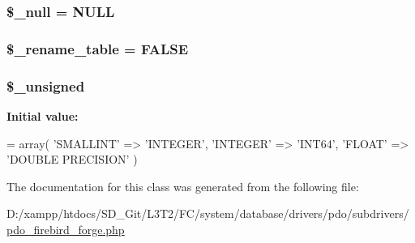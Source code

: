 \subsubsection[{\$\+\_\+null}]{\setlength{\rightskip}{0pt plus 5cm}\$\+\_\+null = \textquotesingle{}N\+U\+L\+L\textquotesingle{}\hspace{0.3cm}{\ttfamily [protected]}}\label{class_c_i___d_b__pdo__firebird__forge_ae58fe6a5104d4a069a49b27533ce808f}
\hypertarget{class_c_i___d_b__pdo__firebird__forge_a1a649e7cf9de16bcf932977b18bc91de}{}
\subsubsection[{\$\+\_\+rename\+\_\+table}]{\setlength{\rightskip}{0pt plus 5cm}\$\+\_\+rename\+\_\+table = F\+A\+L\+S\+E\hspace{0.3cm}{\ttfamily [protected]}}\label{class_c_i___d_b__pdo__firebird__forge_a1a649e7cf9de16bcf932977b18bc91de}
\hypertarget{class_c_i___d_b__pdo__firebird__forge_aae977ae6d61fa183f0b25422b6ddc31c}{}
\subsubsection[{\$\+\_\+unsigned}]{\setlength{\rightskip}{0pt plus 5cm}\$\+\_\+unsigned\hspace{0.3cm}{\ttfamily [protected]}}\label{class_c_i___d_b__pdo__firebird__forge_aae977ae6d61fa183f0b25422b6ddc31c}
{\bfseries Initial value\+:}
\begin{DoxyCode}
= array(
        \textcolor{stringliteral}{'SMALLINT'}  => \textcolor{stringliteral}{'INTEGER'},
        \textcolor{stringliteral}{'INTEGER'}   => \textcolor{stringliteral}{'INT64'},
        \textcolor{stringliteral}{'FLOAT'}     => \textcolor{stringliteral}{'DOUBLE PRECISION'}
    )
\end{DoxyCode}


The documentation for this class was generated from the following file\+:\begin{DoxyCompactItemize}
\item 
D\+:/xampp/htdocs/\+S\+D\+\_\+\+Git/\+L3\+T2/\+F\+C/system/database/drivers/pdo/subdrivers/\hyperlink{pdo__firebird__forge_8php}{pdo\+\_\+firebird\+\_\+forge.\+php}\end{DoxyCompactItemize}
